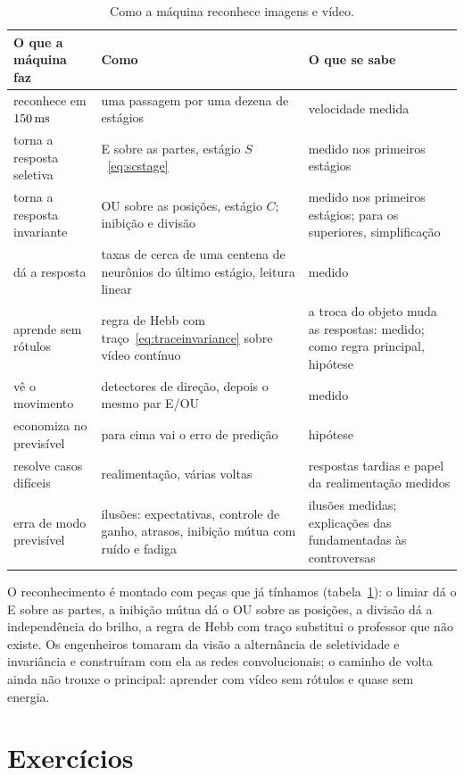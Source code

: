 \begin{table}[t]
\centering
\footnotesize
\setlength{\tabcolsep}{4pt}
\renewcommand{\arraystretch}{1.15}
\begin{tabular}{>{\raggedright}p{3.0cm}>{\raggedright}p{4.6cm}>{\raggedright\arraybackslash}p{5.2cm}}
\toprule
O que a máquina faz & Como & O que se sabe \\
\midrule
reconhece em $150\,\text{ms}$ & uma passagem por uma dezena de estágios & velocidade medida \\
torna a resposta seletiva & E sobre as partes, estágio $S$~\eqref{eq:scstage} & medido nos primeiros estágios \\
torna a resposta invariante & OU sobre as posições, estágio $C$; inibição e divisão & medido nos primeiros estágios; para os superiores, simplificação \\
dá a resposta & taxas de cerca de uma centena de neurônios do último estágio, leitura linear & medido \\
aprende sem rótulos & regra de Hebb com traço~\eqref{eq:traceinvariance} sobre vídeo contínuo & a troca do objeto muda as respostas: medido; como regra principal, hipótese \\
vê o movimento & detectores de direção, depois o mesmo par E/OU & medido \\
economiza no previsível & para cima vai o erro de predição & hipótese \\
resolve casos difíceis & realimentação, várias voltas & respostas tardias e papel da realimentação medidos \\
erra de modo previsível & ilusões: expectativas, controle de ganho, atrasos, inibição mútua com ruído e fadiga & ilusões medidas; explicações das fundamentadas às controversas \\
\bottomrule
\end{tabular}
\caption{Como a máquina reconhece imagens e vídeo.}
\label{tab:recognition}
\end{table}

O reconhecimento é montado com peças que já tínhamos (tabela~\ref{tab:recognition}): o limiar dá o E sobre as partes, a inibição mútua dá o OU sobre as posições, a divisão dá a independência do brilho, a regra de Hebb com traço substitui o professor que não existe. Os engenheiros tomaram da visão a alternância de seletividade e invariância e construíram com ela as redes convolucionais; o caminho de volta ainda não trouxe o principal: aprender com vídeo sem rótulos e quase sem energia.

\section{Exercícios}


